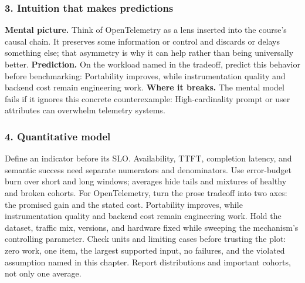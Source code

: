 \subsubsection*{3. Intuition that makes predictions}
\textbf{Mental picture.} Think of OpenTelemetry as a lens inserted into the course's causal chain. It preserves some information or control and discards or delays something else; that asymmetry is why it can help rather than being universally better.
\textbf{Prediction.} On the workload named in the tradeoff, predict this behavior before benchmarking: Portability improves, while instrumentation quality and backend cost remain engineering work.
\textbf{Where it breaks.} The mental model fails if it ignores this concrete counterexample: High-cardinality prompt or user attributes can overwhelm telemetry systems.
\subsubsection*{4. Quantitative model}
Define an indicator before its SLO. Availability, TTFT, completion latency, and semantic success need separate numerators and denominators. Use error-budget burn over short and long windows; averages hide tails and mixtures of healthy and broken cohorts.
For OpenTelemetry, turn the prose tradeoff into two axes: the promised gain and the stated cost. Portability improves, while instrumentation quality and backend cost remain engineering work. Hold the dataset, traffic mix, versions, and hardware fixed while sweeping the mechanism's controlling parameter.
Check units and limiting cases before trusting the plot: zero work, one item, the largest supported input, no failures, and the violated assumption named in this chapter. Report distributions and important cohorts, not only one average.
